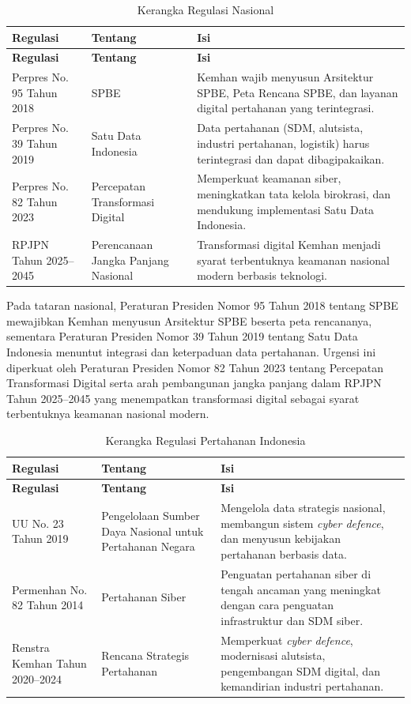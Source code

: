 \begin{longtable}{|p{3.2cm}|p{2.8cm}|p{6.5cm}|}
\caption{Kerangka Regulasi Nasional}
\label{tab:regulasi-nasional} \\
\hline
\textbf{Regulasi} & \textbf{Tentang} & \textbf{Isi} \\
\hline
\endfirsthead
\hline
\textbf{Regulasi} & \textbf{Tentang} & \textbf{Isi} \\
\hline
\endhead
Perpres No. 95 Tahun 2018 & SPBE & Kemhan wajib menyusun Arsitektur SPBE, Peta Rencana SPBE, dan layanan digital pertahanan yang terintegrasi. \\
\hline
Perpres No. 39 Tahun 2019 & Satu Data Indonesia & Data pertahanan (SDM, alutsista, industri pertahanan, logistik) harus terintegrasi dan dapat dibagipakaikan. \\
\hline
Perpres No. 82 Tahun 2023 & Percepatan Transformasi Digital & Memperkuat keamanan siber, meningkatkan tata kelola birokrasi, dan mendukung implementasi Satu Data Indonesia. \\
\hline
RPJPN Tahun 2025--2045 & Perencanaan Jangka Panjang Nasional & Transformasi digital Kemhan menjadi syarat terbentuknya keamanan nasional modern berbasis teknologi. \\
\hline
\end{longtable}

Pada tataran nasional, Peraturan Presiden Nomor 95 Tahun 2018 tentang SPBE mewajibkan Kemhan menyusun Arsitektur SPBE beserta peta rencananya, sementara Peraturan Presiden Nomor 39 Tahun 2019 tentang Satu Data Indonesia menuntut integrasi dan keterpaduan data pertahanan.
Urgensi ini diperkuat oleh Peraturan Presiden Nomor 82 Tahun 2023 tentang Percepatan Transformasi Digital serta arah pembangunan jangka panjang dalam RPJPN Tahun 2025--2045 yang menempatkan transformasi digital sebagai syarat terbentuknya keamanan nasional modern.

\begin{longtable}{|p{3.2cm}|p{2.8cm}|p{6.5cm}|}
\caption{Kerangka Regulasi Pertahanan Indonesia}
\label{tab:regulasi-pertahanan} \\
\hline
\textbf{Regulasi} & \textbf{Tentang} & \textbf{Isi} \\
\hline
\endfirsthead
\hline
\textbf{Regulasi} & \textbf{Tentang} & \textbf{Isi} \\
\hline
\endhead
UU No. 23 Tahun 2019 & Pengelolaan Sumber Daya Nasional untuk Pertahanan Negara & Mengelola data strategis nasional, membangun sistem \textit{cyber defence}, dan menyusun kebijakan pertahanan berbasis data. \\
\hline
Permenhan No. 82 Tahun 2014 & Pertahanan Siber & Penguatan pertahanan siber di tengah ancaman yang meningkat dengan cara penguatan infrastruktur dan SDM siber. \\
\hline
Renstra Kemhan Tahun 2020--2024 & Rencana Strategis Pertahanan & Memperkuat \textit{cyber defence}, modernisasi alutsista, pengembangan SDM digital, dan kemandirian industri pertahanan. \\
\hline
\end{longtable}

